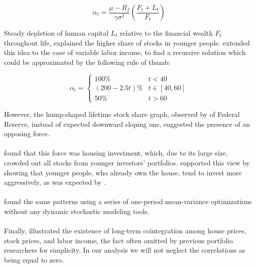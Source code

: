 \begin{equation}\label{eq:bodie}
	\alpha_t = \frac{\mu - R_f}{\gamma \sigma^2} \left( \frac{F_t + L_t}{F_t} \right)
\end{equation}

Steady depletion of human capital $L_t$ relative to the financial wealth $F_t$ throughout life, explained the higher share of stocks in younger people. \citet{cgm} extended this idea to the case of variable labor income, to find a recursive solution which could be approximated by the following rule of thumb:

\begin{equation}\label{eq:cgm}
	\alpha_t =
	\begin{cases}
		100\% 			& 	t<40\\
		(200-2.5t)\% 	& 	t\in[40,60]\\
		50\% 			& 	t>60
	\end{cases}
\end{equation}


However, the hump-shaped lifetime stock share graph, observed by \citet{chang} of Federal Reserve, instead of expected downward sloping one, suggested the presence of an opposing force.

\paragraph{}\citet{cocco} found that this force was housing investment, which, due to its large size, crowded out all stocks from younger investors' portfolios. \citet{flavin} supported this view by showing that younger people, who already own the house, tend to invest more aggressively, as was expected by \citet{bodie}.

\paragraph{}\citet{munk} found the same patterns using a series of one-period mean-variance optimizations without any dynamic stochastic modeling tools.

\paragraph{}Finally, \citet{ascheberg} illustrated the existence of long-term cointegration among house prices, stock prices, and labor income, the fact often omitted by previous portfolio researchers for simplicity. In our analysis we will not neglect the correlations as being equal to zero. 
